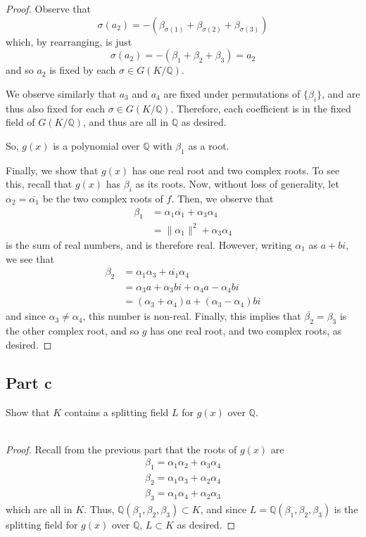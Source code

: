 \documentclass[12pt,reqno]{amsart}
\newcommand{\Q}{\mathbb{Q}}
\begin{document}
\begin{proof}
    Observe that
    \[
        \sigma(a_2) = -(\beta_{\sigma(1)} + \beta_{\sigma(2)} +
        \beta_{\sigma(3)})
    \]
    which, by rearranging, is just
    \[
        \sigma(a_2) = -(\beta_1 + \beta_2 + \beta_3) =a_2
    \]
    and so $a_2$ is fixed by each $\sigma\in G(K/\Q)$.

    We observe similarly that $a_3$ and $a_4$ are fixed under permutations of
    $\{\beta_i\}$, and are thus also fixed for each $\sigma\in G(K/\Q)$.
    Therefore, each coefficient is in the fixed field of $G(K/\Q)$, and thus are
    all in $\Q$ as desired. 

    So, $g(x)$ is a polynomial over $\Q$ with $\beta_1$ as a root.

    Finally, we show that $g(x)$ has one real root and two complex roots. To see
    this, recall that $g(x)$ has $\beta_i$ as its roots. Now, without loss of
    generality, let $\alpha_2=\overline{\alpha_1}$ be the two complex roots of
    $f$. Then, we observe that
    \[
        \begin{aligned}
            \beta_1 &= \alpha_1\overline{\alpha_1} + \alpha_3\alpha_4\\
            &= \|\alpha_1\|^2 + \alpha_3\alpha_4
        \end{aligned}
    \]
    is the sum of real numbers, and is therefore real. However, writing
    $\alpha_1$ as $a+bi$, we see that
    \[
        \begin{aligned}
            \beta_2 &= \alpha_1\alpha_3 + \overline{\alpha_1}\alpha_4\\
            &= \alpha_3a + \alpha_3 bi + \alpha_4a - \alpha_4bi\\
            &= (\alpha_3+\alpha_4)a +(\alpha_3-\alpha_4)bi
        \end{aligned}
    \]
    and since $\alpha_3\neq \alpha_4$, this number is non-real. Finally, this
    implies that $\overline{\beta_2}=\beta_3$ is the other complex root, and so
    $g$ has one real root, and two complex roots, as desired.
\end{proof}

\subsection*{Part c}
Show that $K$ contains a splitting field $L$ for $g(x)$ over $\Q$.
\\
\\
\begin{proof}
    Recall from the previous part that the roots of $g(x)$ are
    \[
        \begin{aligned}
            \beta_1 = \alpha_1\alpha_2 + \alpha_3\alpha_4\\
            \beta_2 = \alpha_1\alpha_3 + \alpha_2\alpha_4\\
            \beta_3 = \alpha_1\alpha_4 + \alpha_2\alpha_3
        \end{aligned}
    \]
    which are all in $K$. Thus, $\Q(\beta_1,\beta_2,\beta_3)\subset K$, and
    since $L = \Q(\beta_1,\beta_2,\beta_3)$ is the splitting field for $g(x)$
    over $\Q$, $L\subset K$ as desired.
\end{proof}
\end{document}
